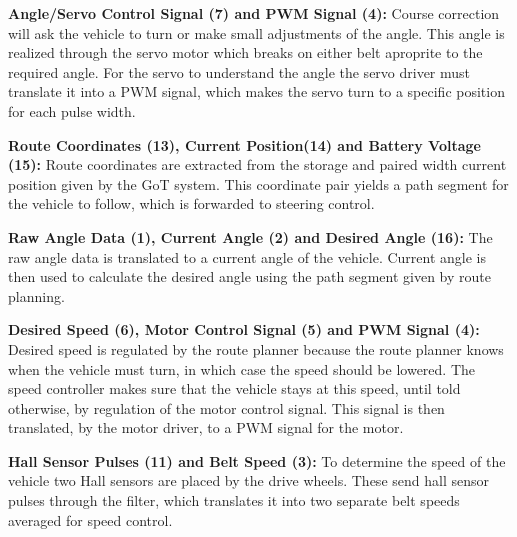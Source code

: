 \textbf{Angle/Servo Control Signal (7) and PWM Signal (4):}
Course correction will ask the vehicle to turn or make small adjustments of the angle. This angle is realized through the servo motor which breaks on either belt aproprite to the required angle. For the servo to understand the angle the servo driver must translate it into a PWM signal, which makes the servo turn to a specific position for each pulse width.

\textbf{Route Coordinates (13), Current Position(14) and Battery Voltage (15):}
Route coordinates are extracted from the storage and paired width current position given by the GoT system. This coordinate pair yields a path segment for the vehicle to follow, which is forwarded to steering control.

\textbf{Raw Angle Data (1), Current Angle (2) and Desired Angle (16):}
The raw angle data is translated to a current angle of the vehicle. Current angle is then used to calculate the desired angle using the path segment given by route planning.

\textbf{Desired Speed (6), Motor Control Signal (5) and PWM Signal (4):}
Desired speed is regulated by the route planner because the route planner knows when the vehicle must turn, in which case the speed should be lowered. The speed controller makes sure that the vehicle stays at this speed, until told otherwise, by regulation of the motor control signal. This signal is then translated, by the motor driver, to a PWM signal for the motor.

\textbf{Hall Sensor Pulses (11) and Belt Speed (3):}
To determine the speed of the vehicle two Hall sensors are placed by the drive wheels. These send hall sensor pulses through the filter, which translates it into two separate belt speeds averaged for speed control.



%
%

